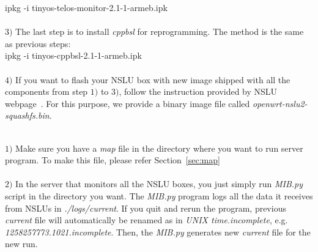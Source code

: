 \documentclass[10pt,conference]{IEEEtran}
\newcommand\spar[1]{\vspace{1ex}\noindent{\bf #1}}
\begin{document}
ipkg -i tinyos-telos-monitor-2.1-1-armeb.ipk \\\\
$3)$ The last step is to install \textit{cppbsl} for reprogramming. The method is the
same as previous steps: \\

ipkg -i tinyos-cppbsl-2.1-1-armeb.ipk\\\\
$4)$ If you want to flash your NSLU box with new image shipped with all the
components from step $1)$ to $3)$, follow the instruction provided by NSLU
webpage~\cite{NSLU}.  For this purpose, we provide a binary image file called
\textit{openwrt-nslu2-squashfs.bin}.

\spar{2. Server}\\
$1)$ Make sure you have a \textit{map} file in the directory where you want to 
run server program. To make this file, please refer Section~\ref{sec:map}\\\\
$2)$ In the server that monitors all the NSLU boxes, you just simply run
\textit{MIB.py} script in the directory you want.  The \textit{MIB.py} program
logs all the data it receives from NSLUs in \textit{./logs/current}.  If you
quit and rerun the program, previous \textit{current} file will automatically
be renamed as in \textit{UNIX time.incomplete}, e.g.
\textit{1258257773.1021.incomplete}.  Then, the \textit{MIB.py} generates new
\textit{current} file for the new run.
\end{document}
